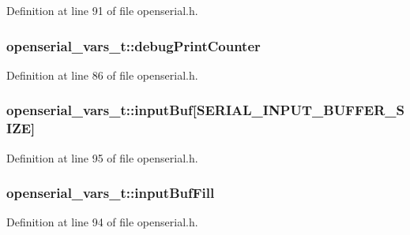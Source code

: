 Definition at line 91 of file openserial.\+h.

\subsubsection[{\texorpdfstring{debug\+Print\+Counter}{debugPrintCounter}}]{ openserial\+\_\+vars\+\_\+t\+::debug\+Print\+Counter}\hypertarget{structopenserial__vars__t_a4d8bec569e88e606f5ffbd39783a4402}{}\label{structopenserial__vars__t_a4d8bec569e88e606f5ffbd39783a4402}


Definition at line 86 of file openserial.\+h.

\subsubsection[{\texorpdfstring{input\+Buf}{inputBuf}}]{ openserial\+\_\+vars\+\_\+t\+::input\+Buf\mbox{[}{\bf S\+E\+R\+I\+A\+L\+\_\+\+I\+N\+P\+U\+T\+\_\+\+B\+U\+F\+F\+E\+R\+\_\+\+S\+I\+ZE}\mbox{]}}\hypertarget{structopenserial__vars__t_a41701302af4b1165f480d54d9ebef6d9}{}\label{structopenserial__vars__t_a41701302af4b1165f480d54d9ebef6d9}


Definition at line 95 of file openserial.\+h.

\subsubsection[{\texorpdfstring{input\+Buf\+Fill}{inputBufFill}}]{ openserial\+\_\+vars\+\_\+t\+::input\+Buf\+Fill}\hypertarget{structopenserial__vars__t_a227eee14af7a774ffd5bf46f8d667b81}{}\label{structopenserial__vars__t_a227eee14af7a774ffd5bf46f8d667b81}


Definition at line 94 of file openserial.\+h.

